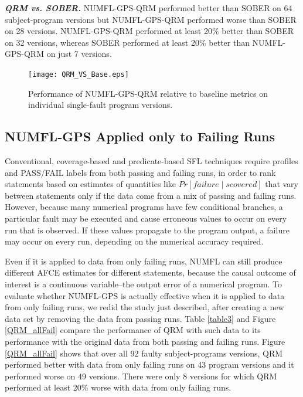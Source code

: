 \textit{\textbf{ QRM vs. SOBER.}}  NUMFL-GPS-QRM performed better than SOBER on 64 subject-program versions but NUMFL-GPS-QRM performed worse than SOBER on 28 versions.  NUMFL-GPS-QRM performed at least 20\% better than SOBER on 32 versions, whereas SOBER performed at least 20\% better than NUMFL-GPS-QRM on just 7 versions.

\begin{figure}[!thpb]
\centering
\texttt{[image: QRM\_VS\_Base.eps]}
\caption{Performance of NUMFL-GPS-QRM relative to baseline metrics on individual single-fault program versions.}
\label{QRM_VS_Base}
\end{figure}

\subsection{NUMFL-GPS Applied only to Failing Runs}\label{VE}
Conventional, coverage-based and predicate-based SFL techniques require profiles and PASS/FAIL labels from both passing and failing runs, in order to rank statements based on estimates of quantities like $Pr [failure \mid s covered]$ \cite{Baah2010} that vary between statements only if the data come from a mix of passing and failing runs.  However, because many numerical programs have few conditional branches, a particular fault may be executed and cause erroneous values to occur on every run that is observed.  If these values propagate to the program output, a failure may occur on every run, depending on the numerical accuracy required.


Even if it is applied to data from only failing runs, NUMFL can still produce different AFCE estimates for different statements, because the causal outcome of interest is a continuous variable--the output error of a numerical program.  To evaluate whether NUMFL-GPS is actually effective when it is applied to data from only failing runs, we redid the study just described, after creating a new data set by removing the data from passing runs.  Table \ref{table3} and Figure \ref{QRM_allFail} compare the performance of QRM with such data to its performance with the original data from both passing and failing runs.  Figure \ref{QRM_allFail} shows that over all 92 faulty subject-programs versions, QRM performed better with data from only failing runs on 43 program versions and it performed worse on 49 versions.  There were only 8 versions for which QRM performed at least 20\% worse with data from only failing runs.

